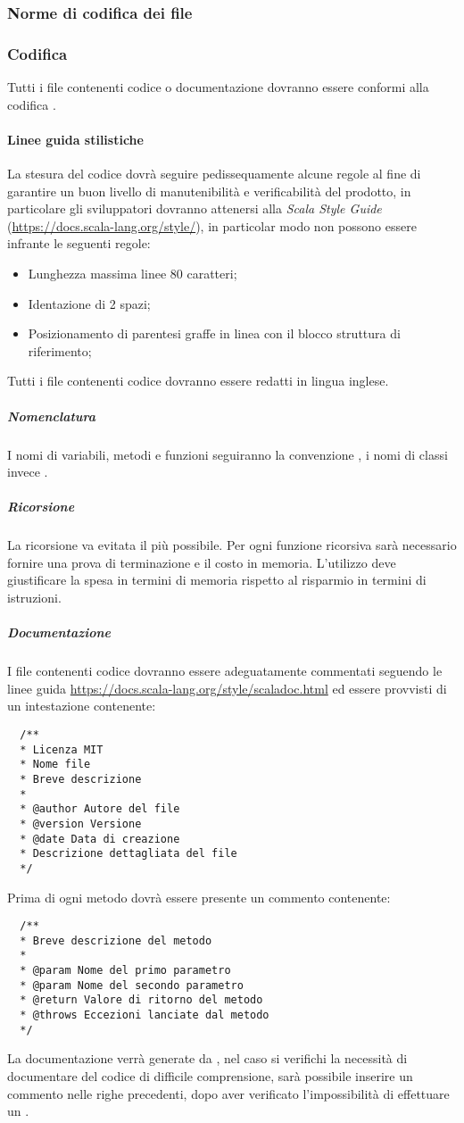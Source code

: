 \documentclass{scalatekids-article}
\begin{document}
\subsubsection{Norme di codifica dei file}
\subsubsection{Codifica}
Tutti i file contenenti codice o documentazione dovranno essere conformi alla
codifica .
\paragraph{Linee guida stilistiche}
La stesura del codice dovrà seguire pedissequamente alcune regole al fine di
garantire un buon livello di manutenibilità e verificabilità del prodotto, in
particolare gli sviluppatori dovranno attenersi alla \textit{Scala Style Guide}
(\url{https://docs.scala-lang.org/style/}), in particolar modo non possono
essere infrante le seguenti regole:
\begin{itemize}
\item Lunghezza massima linee 80 caratteri;
\item Identazione di 2 spazi;
\item Posizionamento di parentesi graffe in linea con il blocco struttura di
  riferimento;
\end{itemize}
Tutti i file contenenti codice dovranno essere redatti in lingua inglese.
\subparagraph{Nomenclatura}
I nomi di variabili, metodi e funzioni seguiranno la convenzione
\textit{}, i nomi di classi invece
\textit{}.
\subparagraph{Ricorsione}
La ricorsione va evitata il più possibile. Per ogni funzione ricorsiva sarà
necessario fornire una prova di terminazione e il costo in memoria. L'utilizzo
deve giustificare la spesa in termini di memoria rispetto al risparmio in
termini di istruzioni.
\subparagraph{Documentazione}
I file contenenti codice dovranno essere adeguatamente commentati seguendo le
linee guida  \url{https://docs.scala-lang.org/style/scaladoc.html} ed essere provvisti di un
intestazione contenente:
\begin{lstlisting}
  /**
  * Licenza MIT
  * Nome file
  * Breve descrizione
  *
  * @author Autore del file
  * @version Versione
  * @date Data di creazione
  * Descrizione dettagliata del file
  */
\end{lstlisting}
Prima di ogni metodo dovrà essere presente un commento  contenente:
\begin{lstlisting}
  /**
  * Breve descrizione del metodo
  *
  * @param Nome del primo parametro
  * @param Nome del secondo parametro
  * @return Valore di ritorno del metodo
  * @throws Eccezioni lanciate dal metodo
  */
\end{lstlisting}
La documentazione verrà generate da , nel caso si verifichi la
necessità di documentare del codice di difficile comprensione, sarà possibile
inserire un commento nelle righe precedenti, dopo aver verificato
l'impossibilità di effettuare un .
\end{document}
